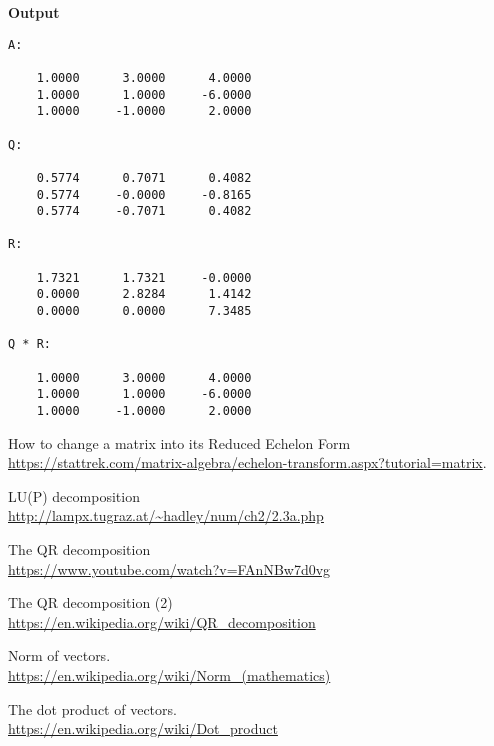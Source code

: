 \hsep
{\bf Output}
\begin{verbatim}
A:

    1.0000      3.0000      4.0000  
    1.0000      1.0000     -6.0000  
    1.0000     -1.0000      2.0000  

Q:

    0.5774      0.7071      0.4082  
    0.5774     -0.0000     -0.8165  
    0.5774     -0.7071      0.4082  

R:

    1.7321      1.7321     -0.0000  
    0.0000      2.8284      1.4142  
    0.0000      0.0000      7.3485 

Q * R:

    1.0000      3.0000      4.0000  
    1.0000      1.0000     -6.0000  
    1.0000     -1.0000      2.0000  
\end{verbatim}


\begin{thebibliography}{9}
How to change a matrix into its Reduced Echelon Form
\\ 
\url{https://stattrek.com/matrix-algebra/echelon-transform.aspx?tutorial=matrix}.

LU(P) decomposition
\\ 
\url{http://lampx.tugraz.at/~hadley/num/ch2/2.3a.php}

The QR decomposition
\\ 
\url{https://www.youtube.com/watch?v=FAnNBw7d0vg}

The QR decomposition (2)
\\ 
\url{https://en.wikipedia.org/wiki/QR_decomposition}

Norm of vectors.
\\ 
\url{https://en.wikipedia.org/wiki/Norm_(mathematics)}

The dot product of vectors.
\\ 
\url{https://en.wikipedia.org/wiki/Dot_product}
\end{thebibliography}
